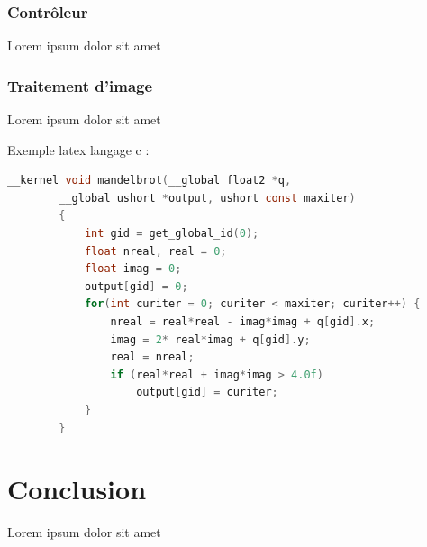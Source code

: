 \documentclass[12pt, openany]{report}
\begin{document}
\subsubsection{Contrôleur}
Lorem ipsum dolor sit amet

\subsubsection{Traitement d'image}
Lorem ipsum dolor sit amet


Exemple latex langage c :
\begin{lstlisting}[language=C]
        __kernel void mandelbrot(__global float2 *q, 
        __global ushort *output, ushort const maxiter)
        {
            int gid = get_global_id(0);
            float nreal, real = 0;
            float imag = 0;
            output[gid] = 0;
            for(int curiter = 0; curiter < maxiter; curiter++) {
                nreal = real*real - imag*imag + q[gid].x;
                imag = 2* real*imag + q[gid].y;
                real = nreal;
                if (real*real + imag*imag > 4.0f)
                    output[gid] = curiter;
            }
        }
      \end{lstlisting}

\section{Conclusion}
Lorem ipsum dolor sit amet




\end{document}

